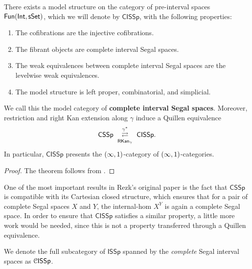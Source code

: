\begin{theorem}\label{ch2:: thm: complete interval model}
    There exists a model structure on the category of pre-interval spaces
    $\operatorname{\sf Fun}(\operatorname{\mathsf{Int}},\operatorname{\sf sSet})$, which we will denote by $\mathsf{CISSp}$, with the
    following properties:
    \begin{enumerate}
        \item The cofibrations are the injective cofibrations.
        \item The fibrant objects are complete interval Segal spaces.
        \item The weak equivalences between complete interval
              Segal spaces are the levelwise weak equivalences.
        \item The model structure is left proper, combinatorial, and simplicial.
    \end{enumerate}
    We call this the model category of \textbf{complete interval Segal spaces}.
    Moreover, restriction and right Kan extension along $\gamma$ induce a
    Quillen equivalence
    \begin{equation}
        \mathsf{CSSp}
        \ \underset{\rkan_{\gamma}}{\overset{\gamma^{*}}{\rightleftarrows}}\
        \mathsf{CISSp}.
    \end{equation}
    In particular, $\mathsf{CISSp}$ presents the $(\operatorname{\infty},1)$-category of
    $(\operatorname{\infty},1)$-categories.
\end{theorem}
\begin{proof}
    The theorem follows from .
\end{proof}

\begin{remark}
    One of the most important results in Rezk's original paper \cite{Rezk01} is the fact that $\mathsf{CSSp}$ is compatible with its Cartesian closed structure, which ensures that for a pair of complete Segal spaces $X$ and $Y$, the internal-hom $X^Y$ is again a complete Segal space. In order to ensure that $\mathsf{CISSp}$ satisfies a similar property, a little more work would be needed, since this is not a property transferred through a Quillen equivalence.
\end{remark}

\begin{notation}
    We denote the full subcategory of $\mathsf{ISSp}$ spanned by the \emph{complete} Segal interval spaces as $\mathcal C\mathsf{ISSp}$.
\end{notation}




